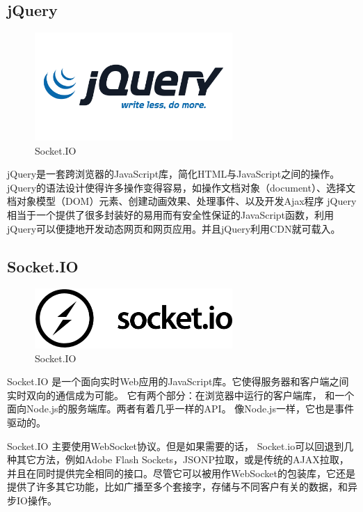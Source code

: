 \documentclass[11pt]{ctexart}
\begin{document}
\subsection{jQuery}
\begin{figure}[H]
    \begin{center}
    \includegraphics[width=0.67\textwidth]{figures/jquery.png}
    \caption{Socket.IO}
    \end{center}
\end{figure}
jQuery是一套跨浏览器的JavaScript库，简化HTML与JavaScript之间的操作。
jQuery的语法设计使得许多操作变得容易，如操作文档对象（document）、选择文档对象模型（DOM）元素、创建动画效果、处理事件、以及开发Ajax程序
jQuery相当于一个提供了很多封装好的易用而有安全性保证的JavaScript函数，利用jQuery可以便捷地开发动态网页和网页应用。并且jQuery利用CDN就可载入。
\subsection{Socket.IO}
\begin{figure}[H]
    \begin{center}
    \includegraphics[width=0.67\textwidth]{figures/socket.io.png}
    \caption{Socket.IO}
    \end{center}
\end{figure}
Socket.IO 是一个面向实时Web应用的JavaScript库。它使得服务器和客户端之间实时双向的通信成为可能。
它有两个部分：在浏览器中运行的客户端库，
和一个面向Node.js的服务端库。两者有着几乎一样的API。
像Node.js一样，它也是事件驱动的。

Socket.IO 主要使用WebSocket协议。但是如果需要的话，
Socket.io可以回退到几种其它方法，例如Adobe Flash Sockets，JSONP拉取，或是传统的AJAX拉取，
并且在同时提供完全相同的接口。尽管它可以被用作WebSocket的包装库，它还是提供了许多其它功能，比如广播至多个套接字，存储与不同客户有关的数据，和异步IO操作。
\end{document}
